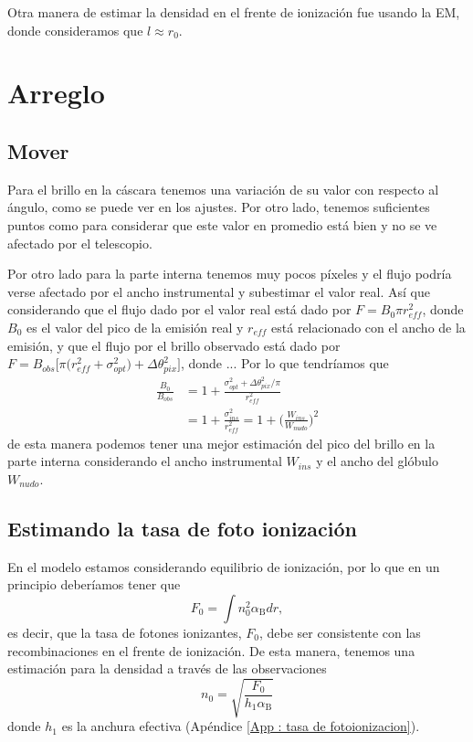 \documentclass{book}
\begin{document}
Otra manera de estimar la densidad en el frente de ionización fue usando la EM, donde consideramos que $l\approx r_0$. 

\chapter{Arreglo}

\section{Mover}

Para el brillo en la cáscara tenemos una variación de su valor con respecto al ángulo, como se puede ver en los ajustes. Por otro lado, tenemos suficientes puntos como para considerar que este valor en promedio está bien y no se ve afectado por el telescopio. 

Por otro lado para la parte interna tenemos muy pocos píxeles y el flujo podría verse afectado por el ancho instrumental y subestimar el valor real.  Así que considerando que el flujo dado por el valor real está dado por $F=B_0\pi r_{eff}^2$, donde $B_0$ es el valor del pico de la emisión real y  $r_{eff}$ está relacionado con el ancho de la emisión, y que el flujo por el brillo  observado está dado por $F=B_{obs}\Big[\pi\Big(r_{eff}^2+\sigma_{opt}^2\Big)+\Delta\theta_{pix}^2\Big]$, donde ... Por lo que tendríamos que 
\begin{equation*} \label{eq1}
\begin{split}
\frac{B_0}{B_{obs}} & = 1 + \frac{\sigma_{opt}^2+\Delta\theta_{pix}^2/\pi}{r_{eff}^2} \\
 & = 1 + \frac{\sigma_{ins}^2}{r_{eff}^2} = 1 + \Big(\frac{W_{ins}}{W_{nudo}}\Big)^2
\end{split}
\end{equation*}
de esta manera podemos tener una mejor estimación del pico del brillo en la parte interna considerando el ancho instrumental $W_{ins}$ y el ancho del glóbulo $W_{nudo}$.

\section{Estimando la tasa de foto ionización}

En el modelo estamos considerando equilibrio de ionización, por lo que en un principio deberíamos tener que 
\[F_0=\int n_0^2\alpha_\mathrm{B} dr,\] es decir, que la tasa de fotones ionizantes, $F_0$, debe ser consistente con las recombinaciones en el frente de ionización. De esta manera, tenemos una estimación para la densidad a través de las observaciones
\[n_0 = \sqrt{\frac{F_0}{h_1\alpha_\mathrm{B}}}\] donde $h_1$ es la anchura efectiva (Apéndice \ref{App : tasa de fotoionizacion}). 
\end{document}
